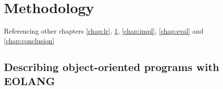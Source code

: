 \chapter{Methodology}
\label{chap:met}


Referencing other chapters \ref{chap:lr}, \ref{chap:met}, \ref{chap:impl}, \ref{chap:eval} and \ref{chap:conclusion}

\section{Describing object-oriented programs with EOLANG}

\section{}